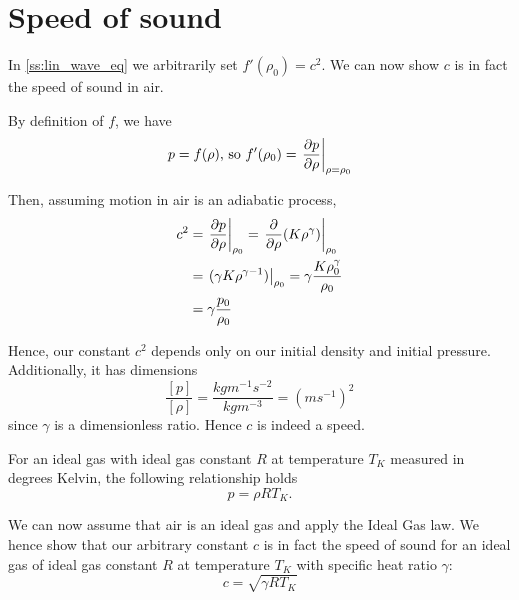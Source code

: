 \section{Speed of sound}\label{ss:speed_of_sound}
In \ref{ss:lin_wave_eq} we arbitrarily set $f'(\rho_0)=c^2$. We can now show $c$ is in fact the speed of sound in air. \par
%
By definition of $f$, we have
    \begin{equation}
         p = f(\rho) \text{, so } f'(\rho_0) = \left.\frac{\partial p}{\partial \rho} \right|_{\rho=\rho_0}
    \end{equation} \par
%
Then, assuming motion in air is an adiabatic process,
    \begin{align*}
        c^2 &= \left. \frac{\partial p}{\partial \rho} \right|_{\rho_0}
        = \left. \frac{\partial }{\partial \rho} (K \rho^\gamma) \right|_{\rho_0} \\
        &= \left. (\gamma K \rho^{\gamma-1}) \right|_{\rho_0}
        = \gamma \frac{K \rho_0 ^\gamma}{\rho_0} \\
        &= \gamma \frac{p_0}{\rho_0}
    \end{align*} \par
Hence, our constant $c^2$ depends only on our initial density and initial pressure. Additionally, it has dimensions
    \begin{equation*}
        \frac{[p]}{[\rho]} = \frac{kgm^{-1}s^{-2}}{kgm^{-3}} = (ms^{-1})^2
    \end{equation*}
since $\gamma$ is a dimensionless ratio. Hence $c$ is indeed a speed.
\begin{law}
    For an ideal gas with ideal gas constant $R$ at temperature $T_K$ measured in degrees Kelvin, the following relationship holds
        \begin{equation*}
            p = \rho R T_K.
        \end{equation*}
    \end{law} \par
%
We can now assume that air is an ideal gas and apply the Ideal Gas law. We hence show that our arbitrary constant $c$ is in fact the speed of sound for an ideal gas of ideal gas constant $R$ at temperature $T_K$ with specific heat ratio $\gamma$:
    \begin{equation}
        c = \sqrt{\gamma R T_K}
    \end{equation}
%
